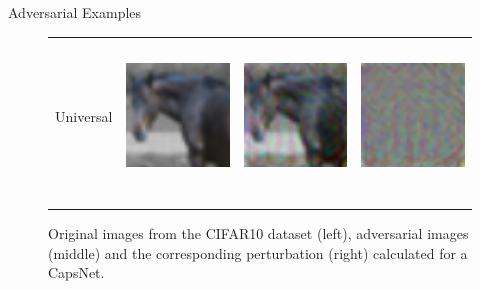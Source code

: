 \documentclass[final]{beamer}
\newlength{\onecolwid}
\newlength{\twocolwid}
\begin{document}
\begin{frame}[t]
\begin{columns}[t]
\begin{column}{\twocolwid}
\begin{columns}[t,totalwidth=\twocolwid]
\begin{column}{\onecolwid}
\begin{block}{Adversarial Examples}
\begin{figure}[h]
\begin{tabular}{rlll}
			Universal & \includegraphics[height=4cm, align=c]{../figures/universal_orig.pdf} & \includegraphics[height=4cm, align=c]{../figures/universal_adversarial.pdf} & \includegraphics[height=4cm, align=c]{../figures/universal_diff.pdf}\\
			\\
			\vspace{0.1cm}\\
		\end{tabular}
		\caption{Original images from the CIFAR10 dataset (left), adversarial images (middle) and the corresponding perturbation (right) calculated for a CapsNet.\label{tab:images}}
	\end{figure}
\end{block}


\end{column} %

\end{columns} %





\end{column}
\end{columns}
\end{frame}
\end{document}
